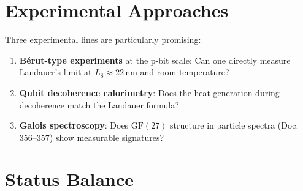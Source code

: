\section{Experimental Approaches}

Three experimental lines are particularly promising:
\begin{enumerate}
  \item \textbf{Bérut-type experiments} at the p-bit scale: Can one directly measure Landauer's limit
    at $L_8 \approx 22\,\text{nm}$ and room temperature?
  \item \textbf{Qubit decoherence calorimetry}: Does the heat generation during
    decoherence match the Landauer formula?
  \item \textbf{Galois spectroscopy}: Does $\mathrm{GF}(27)$ structure in
    particle spectra (Doc.\,356--357) show measurable signatures?
\end{enumerate}

\section{Status Balance}

